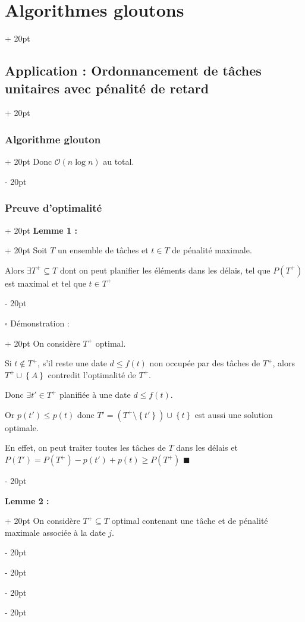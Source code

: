 \documentclass[a4paper, 12pt, twoside]{article}
\newcommand{\set}[1]{\left\{ #1 \right\}}
\renewcommand{\le}{\leqslant}
\renewcommand{\ge}{\geqslant}
\newcommand{\ind}[1][20pt]{\advance\leftskip + #1}
\newcommand{\deind}[1][20pt]{\advance\leftskip - #1}
\newenvironment{indt}[2][20pt]{#2 \par \ind[#1]}{\par \deind} %
\begin{document}
\begin{indt}{\section{Algorithmes gloutons}}
\begin{indt}{\subsection{Application : Ordonnancement de tâches unitaires avec pénalité de retard}}
\begin{indt}{\subsubsection{Algorithme glouton}}
                Donc $\mathcal O(n \log n)$ au total.
            \end{indt}
            
            \vspace{12pt}
            
            \begin{indt}{\subsubsection{Preuve d'optimalité}}
                \begin{indt}{\textbf{Lemme 1 :}}
                    Soit $T$ un ensemble de tâches et $t \in T$ de pénalité maximale.
                    
                    Alors $\exists T^+ \subseteq T$ dont on peut planifier les éléments dans les délais, tel que $P(T^+)$ est maximal et tel que $t \in T^+$
                \end{indt}
                
                \vspace{12pt}
                
                \begin{indt}{$\square$ Démonstration :}
                    On considère $T^+$ optimal.
                    
                    Si $t \not \in T^+$, s'il reste une date $d \le f(t)$ non occupée par des tâches de $T^+$, alors $T^+ \cup \set A$ contredit l'optimalité de $T^+$.
                    
                    Donc $\exists t' \in T^+$ planifiée à une date $d \le f(t)$.
                    
                    Or $p(t') \le p(t)$ donc $T' = (T^+ \setminus \set{t'}) \cup \set t$ est aussi une solution optimale.
                    
                    En effet, on peut traiter toutes les tâches de $T$ dans les délais et $P(T') = P(T^+) - p(t') + p(t) \ge P(T^+)$
                    $\blacksquare$
                \end{indt}
                
                \vspace{12pt}
                
                \begin{indt}{\textbf{Lemme 2 :}}
                    On considère $T^+ \subseteq T$ optimal contenant une tâche et de pénalité maximale associée à la date $j$.
                    

\end{indt}
\end{indt}
\end{indt}
\end{indt}
\end{document}
